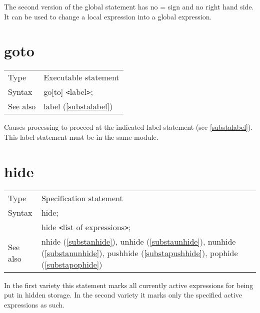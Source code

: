 \noindent The second version of the global statement has no = sign and no 
right hand side. It can be used to change a local expression 
into a global expression. \vspace{10mm}


\section{goto}
\label{substagoto}

\noindent \begin{tabular}{ll}
Type & Executable statement\\
Syntax & go[to] {\tt<}label{\tt>}; \\
See also & label (\ref{substalabel})
\end{tabular} \vspace{4mm}

\noindent Causes processing to proceed at the indicated 
label statement 
(see \ref{substalabel}). This label statement must be in the same module. 
\vspace{10mm}


\section{hide}
\label{substahide}

\noindent \begin{tabular}{ll}
Type & Specification statement\\
Syntax & hide; \\
       & hide {\tt<}list of expressions{\tt>};
\\ See also & nhide (\ref{substanhide}),
              unhide (\ref{substaunhide}),
              nunhide (\ref{substanunhide}),
              pushhide (\ref{substapushhide}),
              pophide (\ref{substapophide})
\end{tabular} \vspace{4mm}

\noindent In the first variety this statement marks all currently active 
expressions for being put in hidden storage. In the second variety it marks 
only the specified active expressions as such. \vspace{4mm}

